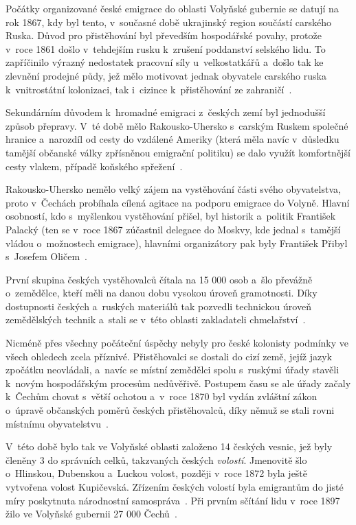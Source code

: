 Počátky organizované české emigrace do oblasti Volyňské gubernie se datují na rok 1867, kdy byl tento, v~současné době ukrajinský region součástí carského Ruska. Důvod pro přistěhování byl převedším hospodářské povahy, protože v~roce 1861 došlo v~tehdejším rusku k~zrušení poddanství selského lidu. To zapříčinilo výrazný nedostatek pracovní síly u~velkostatkářů a~došlo tak ke zlevnění prodejné půdy, jež mělo motivovat jednak obyvatele carského ruska k~vnitrostátní kolonizaci, tak i~cizince k~přistěhování ze zahraničí~\parencite{Auerhan1920}.

Sekundárním důvodem k~hromadné emigraci z~českých zemí byl jednodušší způsob přepravy. V~té době mělo Rakousko-Uhersko s~carským Ruskem společné hranice a~narozdíl od cesty do vzdálené Ameriky (která měla navíc v~důsledku tamější občanské války zpřísněnou emigrační politiku) se dalo využít komfortnější cesty vlakem, případě koňského spřežení~\parencite{Hofman2020}.

Rakousko-Uhersko nemělo velký zájem na vystěhování části svého obyvatelstva, proto v~Čechách probíhala cílená agitace na podporu emigrace do Volyně. Hlavní osobností, kdo s~myšlenkou vystěhování přišel, byl historik a~politik František Palacký (ten se v~roce 1867 zúčastnil delegace do Moskvy, kde jednal s~tamější vládou o~možnostech emigrace), hlavními organizátory pak byly František Přibyl s~Josefem Oličem~\parencite{Hofman2020}.

První skupina českých vystěhovalců čítala na 15 000 osob a~šlo převážně o~zemědělce, kteří měli na danou dobu vysokou úroveň gramotnosti. Díky dostupnosti českých a~ruských materiálů tak pozvedli technickou úroveň zemědělských technik a~stali se v~této oblasti zakladateli chmelařství~\parencite{Vaculik2009b}.

Nicméně přes všechny počáteční úspěchy nebyly pro české kolonisty podmínky ve všech ohledech zcela příznivé. Přistěhovalci se dostali do cizí země, jejíž jazyk zpočátku neovládali, a~navíc se místní zemědělci spolu s~ruskými úřady stavěli k~novým hospodářským procesům nedůvěřivě. Postupem času se ale úřady začaly k~Čechům chovat s~větší ochotou a~v~roce 1870 byl vydán zvláštní zákon o~úpravě občanských poměrů českých přistěhovalců, díky němuž se stali rovni místnímu obyvatelstvu~\parencite{Auerhan1920}.

V~této době bylo tak ve Volyňské oblasti založeno 14 českých vesnic, jež byly členěny 3 do správních celků, takzvaných českých \emph{volostí}. Jmenovitě šlo o~Hlinskou, Dubenskou a~Luckou volost, později v~roce 1872 byla ještě vytvořena volost Kupičevská. Zřízením českých volostí byla emigrantům do jisté míry poskytnuta národnostní samospráva~\parencite{Auerhan1920}. Při prvním sčítání lidu v~roce 1897 žilo ve Volyňské gubernii 27 000 Čechů~\parencite{Vaculik2009a}.

